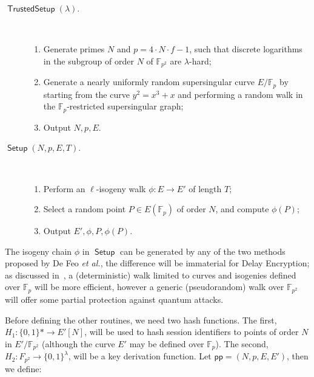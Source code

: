 \documentclass{llncs}
\newcommand{\F}{\mathbb{F}}
\DeclareMathOperator{\Setup}{\mathsf{Setup}}
\DeclareMathOperator{\TSetup}{\mathsf{TrustedSetup}}
\newcommand{\pp}{\mathsf{pp}}
\begin{document}
\begin{description}
\item[$\TSetup(\lambda)$.]\
  \begin{enumerate}
  \item Generate primes $N$ and $p=4\cdot N\cdot f - 1$, such that
    discrete logarithms in the subgroup of order $N$ of $\F_{p^2}$ are
    $\lambda$-hard;
  \item Generate a nearly uniformly random supersingular curve
    $E/\F_p$ by starting from the curve $y^2=x^3+x$ and performing a
    random walk in the $\F_p$-restricted supersingular graph;
  \item Output $N,p,E$.
  \end{enumerate}
\item[$\Setup(N,p,E,T)$.]\
  \begin{enumerate}
  \item Perform an $\ell$-isogeny walk $\phi:E\to E'$ of length $T$;
  \item Select a random point $P\in E(\F_p)$ of order $N$, and compute
    $\phi(P)$;
  \item Output $E',\phi,P,\phi(P)$.
  \end{enumerate}
\end{description}

The isogeny chain $\phi$ in $\Setup$ can be generated by any of the
two methods proposed by De Feo \emph{et al.}, the difference will be
immaterial for Delay Encryption; as discussed
in~\cite{10.1007/978-3-030-34578-5_10}, a (deterministic) walk limited
to curves and isogenies defined over $\F_p$ will be more efficient,
however a generic (pseudorandom) walk over $\F_{p^2}$ will offer some
partial protection against quantum attacks.

Before defining the other routines, we need two hash functions. %
The first, $H_1:\{0,1\}*\to E'[N]$, will be used to hash session
identifiers to points of order $N$ in $E'/\F_{p^2}$ (although the
curve $E'$ may be defined over $\F_p$). %
The second, $H_2:F_{p^2}\to\{0,1\}^\lambda$, will be a key derivation
function. %
Let $\pp = (N,p,E,E')$, then we define:
\end{document}
